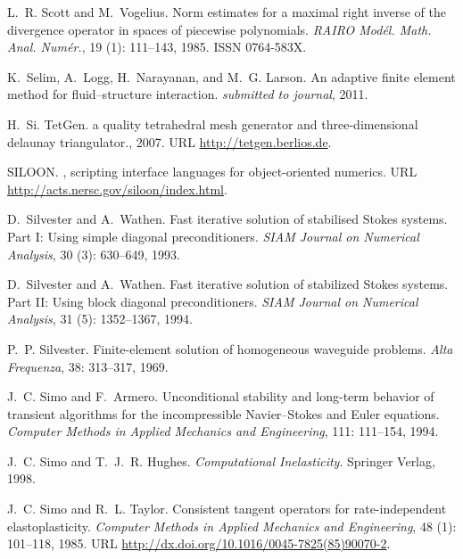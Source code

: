 \begin{thebibliography}{467}
L.~R. Scott and M.~Vogelius.
\newblock Norm estimates for a maximal right inverse of the divergence operator
  in spaces of piecewise polynomials.
\newblock \emph{RAIRO Mod\'el. Math. Anal. Num\'er.}, 19 (1):
  111--143, 1985.
\newblock ISSN 0764-583X.

K.~Selim, A.~Logg, H.~Narayanan, and M.~G. Larson.
\newblock An adaptive finite element method for fluid--structure interaction.
\newblock \emph{submitted to journal}, 2011.

H.~Si.
\newblock Tet{G}en. a quality tetrahedral mesh generator and three-dimensional
  delaunay triangulator., 2007.
\newblock URL \url{http://tetgen.berlios.de}.

SILOON.
, scripting interface languages for object-oriented numerics.
\newblock URL \url{http://acts.nersc.gov/siloon/index.html}.

D.~Silvester and A.~Wathen.
\newblock Fast iterative solution of stabilised {S}tokes systems. {P}art {I}:
  {U}sing simple diagonal preconditioners.
\newblock \emph{SIAM Journal on Numerical Analysis}, 30 (3):
  630--649, 1993.

D.~Silvester and A.~Wathen.
\newblock Fast iterative solution of stabilized {S}tokes systems. {P}art {II}:
  {U}sing block diagonal preconditioners.
\newblock \emph{SIAM Journal on Numerical Analysis}, 31 (5):
  1352--1367, 1994.

P.~P. Silvester.
\newblock Finite-element solution of homogeneous waveguide problems.
\newblock \emph{Alta Frequenza}, 38: 313--317, 1969.

J.~C. Simo and F.~Armero.
\newblock Unconditional stability and long-term behavior of transient
  algorithms for the incompressible {N}avier--{S}tokes and {E}uler equations.
\newblock \emph{Computer Methods in Applied Mechanics and Engineering},
  111: 111--154, 1994.

J.~C. Simo and T.~J.~R. Hughes.
\newblock \emph{Computational Inelasticity}.
\newblock Springer Verlag, 1998.

J.~C. Simo and R.~L. Taylor.
\newblock Consistent tangent operators for rate-independent elastoplasticity.
\newblock \emph{Computer Methods in Applied Mechanics and Engineering},
  48 (1): 101--118, 1985.
\newblock URL \url{http://dx.doi.org/10.1016/0045-7825(85)90070-2}.


\end{thebibliography}
